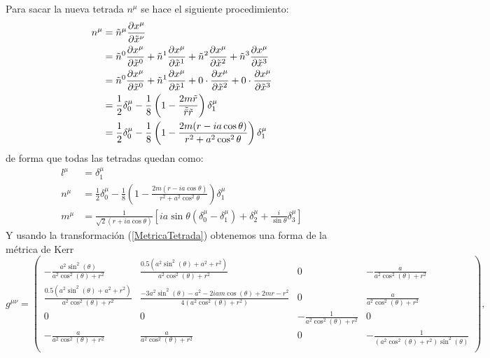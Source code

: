 Para sacar la nueva tetrada $n^\mu$ se hace el siguiente procedimiento:
\begin{equation}
\begin{aligned}
    n^\mu&= \tilde{n}^\mu \frac{\partial x^\mu}{\partial \tilde{x}^\nu} \\
&= \tilde{n}^0 \frac{\partial x^\mu}{\partial \tilde{x}^0} + \tilde{n}^1 \frac{\partial x^\mu}{\partial \tilde{x}^1} + \tilde{n}^2 \frac{\partial x^\mu}{\partial \tilde{x}^2} + \tilde{n}^3 \frac{\partial x^\mu}{\partial \tilde{x}^3} \\
&= \tilde{n}^0 \frac{\partial x^\mu}{\partial \tilde{x}^0} + \tilde{n}^1 \frac{\partial x^\mu}{\partial \tilde{x}^1} +0 \cdot \frac{\partial x^\mu}{\partial \tilde{x}^2} + 0 \cdot \frac{\partial x^\mu}{\partial \tilde{x}^3} \\
& = \frac{1}{2}\delta^{\mu}_0 -\frac{1}{8} \left(1 - \frac{2 m\tilde{r}}{\tilde{\bar{r}}\tilde{r}}\right)\delta_1^\mu \\
& = \frac{1}{2}\delta^{\mu}_0 -\frac{1}{8} \left(1 - \frac{2 m(r-ia\cos\theta)}{r^2+a^2 \cos^2 \theta }\right)\delta_1^\mu \\
\end{aligned}    
\end{equation}
de forma que todas las tetradas quedan como:
\begin{equation}
    \begin{aligned}
        l^\mu & = \delta_1^\mu     \\
        n^\mu & = \frac{1}{2}\delta^{\mu}_0 -\frac{1}{8} \left(1 - \frac{2 m(r-ia\cos\theta)}{r^2+a^2 \cos^2 \theta }\right)\delta_1^\mu  \\
        m^\mu & = \frac{1}{\sqrt{2}(r + ia \cos \theta)} \left[ ia \sin \theta (\delta_0^\mu - \delta_1^\mu) + \delta_2^\mu + \frac{i}{\sin \theta} \delta_3^\mu \right]
    \end{aligned}
\end{equation}
Y usando la transformación (\ref{MetricaTetrada}) obtenemos una forma de la métrica de Kerr
\begin{equation}
   g^{\mu\nu} =  \left(\begin{matrix}
- \frac{a^{2} \sin^{2}{\left(\theta \right)}}{a^{2} \cos^{2}{\left(\theta \right)} + r^{2}} & \frac{0.5 \left(a^{2} \sin^{2}{\left(\theta \right)} + a^{2} + r^{2}\right)}{a^{2} \cos^{2}{\left(\theta \right)} + r^{2}} & 0 & - \frac{a}{a^{2} \cos^{2}{\left(\theta \right)} + r^{2}} \\
\frac{0.5 \left(a^{2} \sin^{2}{\left(\theta \right)} + a^{2} + r^{2}\right)}{a^{2} \cos^{2}{\left(\theta \right)} + r^{2}} & \frac{- 3 a^{2} \sin^{2}{\left(\theta \right)} - a^{2} - 2 i a m \cos{\left(\theta \right)} + 2 m r - r^{2}}{4 \left(a^{2} \cos^{2}{\left(\theta \right)} + r^{2}\right)} & 0 & \frac{a}{a^{2} \cos^{2}{\left(\theta \right)} + r^{2}} \\
0 & 0 & - \frac{1}{a^{2} \cos^{2}{\left(\theta \right)} + r^{2}} & 0 \\
- \frac{a}{a^{2} \cos^{2}{\left(\theta \right)} + r^{2}} & \frac{a}{a^{2} \cos^{2}{\left(\theta \right)} + r^{2}} & 0 & - \frac{1}{\left(a^{2} \cos^{2}{\left(\theta \right)} + r^{2}\right) \sin^{2}{\left(\theta \right)}} \\
\end{matrix}\right),
\end{equation}

